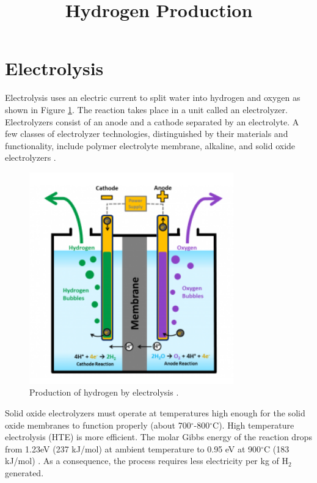 \documentclass[11pt,letterpaper]{article}
\title{Hydrogen Production}
\begin{document}

\section{Electrolysis}



Electrolysis uses an electric current to split water into hydrogen and oxygen as shown in Figure \ref{fig:electro}.
The reaction takes place in a unit called an electrolyzer.
Electrolyzers consist of an anode and a cathode separated by an electrolyte.
A few classes of electrolyzer technologies, distinguished by their materials and functionality, include polymer electrolyte membrane, alkaline, and solid oxide electrolyzers \cite{doe_office_of_energy_efficiency_and_renewable_energy_hydrogen_2020}.

\begin{figure}[]
	\centering
	\includegraphics[width=0.55\linewidth]{figures/electrolysis.png}
	\hfill
	\caption{Production of hydrogen by electrolysis \cite{doe_office_of_energy_efficiency_and_renewable_energy_hydrogen_2020}.}
	\label{fig:electro}
\end{figure}

Solid oxide electrolyzers must operate at temperatures high enough for the solid oxide membranes to function properly (about 700$^{\circ}$-800$^{\circ}$C).
High temperature electrolysis (HTE) is more efficient.
The molar Gibbs energy of the reaction drops from 1.23eV (237 kJ/mol) at ambient temperature to 0.95 eV at 900$^{\circ}$C (183 kJ/mol) \cite{helmeth_high_2020}.
As a consequence, the process requires less electricity per kg of H$_2$ generated.
\end{document}
